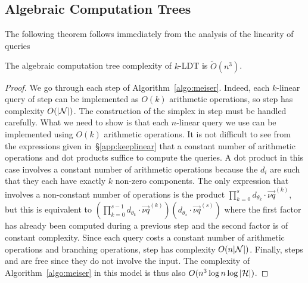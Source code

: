 \subsection{Algebraic Computation Trees}%
\label{app:act}

The following theorem follows immediately from
the analysis of the linearity of queries
\begin{theorem}\label{thm:act}
	The algebraic computation tree complexity of \(k\)-LDT is
	\(\tilde{O}(n^3)\).
\end{theorem}

\begin{proof}
We go through each step of Algorithm~\ref{algo:meiser}.
Indeed, each \(k\)-linear query of step  can be implemented as
\(O(k)\) arithmetic operations, so step  has complexity
\(O(|{\mathcal{N}}|)\).
The construction of the simplex in step  must be handled carefully.
What we need to show is that each \(n\)-linear query we use can be implemented
using $O(k)$ arithmetic operations. It is not difficult to see from the
expressions given in~\S\ref{app:keeplinear} that a constant number of arithmetic
operations and dot products suffice to
compute the queries. A dot product in this case involves a constant number
of arithmetic operations because the \(d_i\) are such that they each have
exactly \(k\) non-zero components. The only expression that involves a
non-constant number of operations is the product \(\prod_{k=0}^{s}
d_{\theta_{k}} \cdot \vec{\nu q}^{(k)}\), but this is equivalent to
\((\prod_{k=0}^{s-1}
	d_{\theta_{k}} \cdot \vec{\nu q}^{(k)})(d_{\theta_{s}} \cdot
	\vec{\nu q}^{(s)})\)
where the first factor has already been computed during a previous step and
the second factor is of constant complexity. Since each query costs a constant
number of arithmetic operations and branching operations, step 
has complexity \(O(n|{\mathcal{N}}|)\).
Finally, steps  and  are free since they do not involve the
input. The complexity of Algorithm~\ref{algo:meiser} in this model is thus also \(O(n^3
\log n \log |{\mathcal{H}}|)\).
\end{proof}

